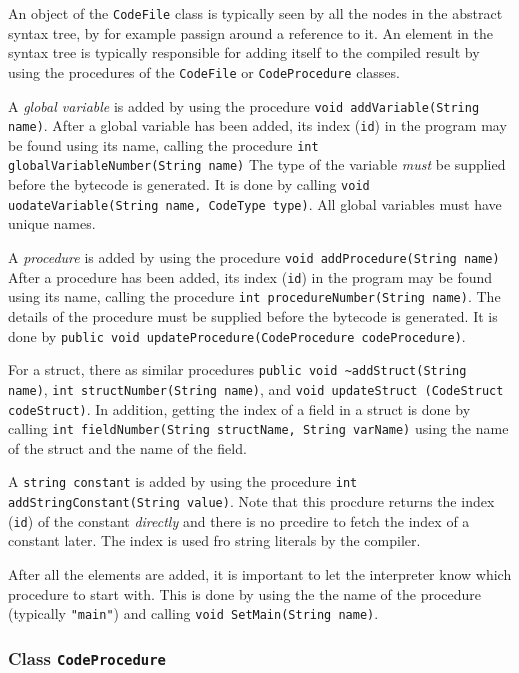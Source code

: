 \documentclass[11pt]{article}
\begin{document}
An object of the \texttt{CodeFile} class is typically seen by all the nodes in the
abstract syntax tree, by for example passign around a reference to it. An
element in the syntax tree is typically responsible for adding itself to
the compiled result by using the procedures of the \texttt{CodeFile} or
\texttt{CodeProcedure} classes.

A \emph{global variable} is added by using the procedure \texttt{void
addVariable(String name)}. After a global variable has been added, its
index (\texttt{id}) in the program may be found using its name, calling the
procedure \texttt{int globalVariableNumber(String name)} The type of the variable
\emph{must} be supplied before the bytecode is generated. It is done by calling
\texttt{void uodateVariable(String name, CodeType type)}. All global variables
must have unique names.


A \emph{procedure} is added by using the procedure \texttt{void addProcedure(String
name)} After a procedure has been added, its index (\texttt{id}) in the program
may be found using its name, calling the procedure \texttt{int
procedureNumber(String name)}. The details of the procedure must be
supplied before the bytecode is generated. It is done by \texttt{public void
updateProcedure(CodeProcedure codeProcedure)}. 


For a struct, there as similar procedures \texttt{public void \textasciitilde{}addStruct(String
name)}, \texttt{int structNumber(String name)}, and \texttt{void updateStruct (CodeStruct
codeStruct)}.  In addition, getting the index of a field in a struct is
done by calling \texttt{int fieldNumber(String structName, String varName)} using
the name of the struct and the name of the field.

A \texttt{string constant} is added by using the procedure \texttt{int
addStringConstant(String value)}. Note that this procdure returns the index
(\texttt{id}) of the constant \emph{directly} and there is no prcedire to fetch the
index of a constant later.  The index is used fro string literals by the
compiler.

After all the elements are added, it is important to let the interpreter
know which procedure to start with. This is done by using the the name of
the procedure (typically \texttt{"main"}) and calling \texttt{void SetMain(String name)}.


\subsubsection{Class \texttt{CodeProcedure}}
\label{sec:org3c1d384}
\end{document}
